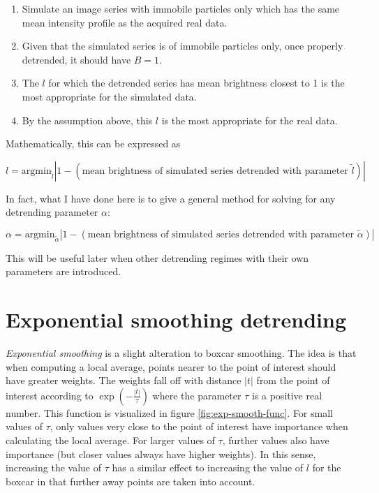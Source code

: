 \documentclass[12pt,]{book}
\providecommand{\tightlist}{%
  \setlength{\itemsep}{0pt}\setlength{\parskip}{0pt}}
\theoremstyle{definition}
\theoremstyle{definition}
\theoremstyle{definition}
\theoremstyle{remark}
\begin{document}
\begin{enumerate}
\def\labelenumi{\arabic{enumi}.}
\tightlist
\item
  Simulate an image series with immobile particles only which has the
  same mean intensity profile as the acquired real data.
\item
  Given that the simulated series is of immobile particles only, once
  properly detrended, it should have \(B = 1\).
\item
  The \(l\) for which the detrended series has mean brightness closest
  to 1 is the most appropriate for the simulated data.
\item
  By the assumption above, this \(l\) is the most appropriate for the
  real data.
\end{enumerate}

Mathematically, this can be expressed as

\begin{equation}
l = \text{argmin}_{\tilde{l}} |1 - (\text{mean brightness of simulated series detrended with parameter } \tilde{l})|
\label{eq:leq}
\end{equation}

In fact, what I have done here is to give a general method for solving
for any detrending parameter \(\alpha\):

\begin{equation}
\alpha = \text{argmin}_{\tilde{\alpha}} |1 - (\text{mean brightness of simulated series detrended with parameter } \tilde{\alpha})|
\label{eq:detrend-param}
\end{equation}

This will be useful later when other detrending regimes with their own
parameters are introduced.

\section{Exponential smoothing
detrending}\label{exponential-smoothing-detrending}

\emph{Exponential smoothing} is a slight alteration to boxcar smoothing.
The idea is that when computing a local average, points nearer to the
point of interest should have greater weights. The weights fall off with
distance \(|t|\) from the point of interest according to
\(\exp(-\frac{|t|}{\tau})\) where the parameter \(\tau\) is a positive
real number. This function is visualized in figure
\ref{fig:exp-smooth-func}. For small values of \(\tau\), only values
very close to the point of interest have importance when calculating the
local average. For larger values of \(\tau\), further values also have
importance (but closer values always have higher weights). In this
sense, increasing the value of \(\tau\) has a similar effect to
increasing the value of \(l\) for the boxcar in that further away points
are taken into account.
\end{document}

